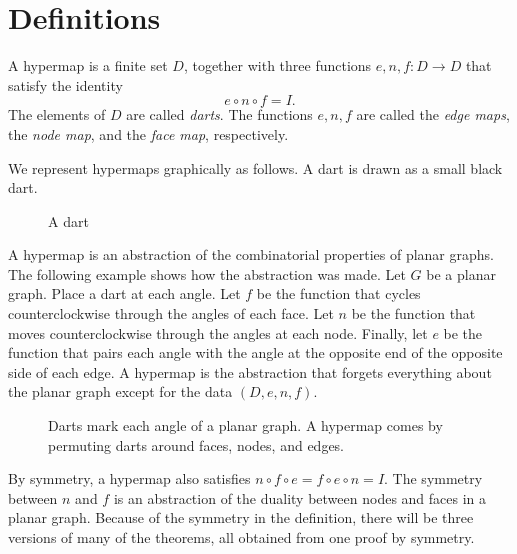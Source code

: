 


\section{Definitions}



\begin{definition}  A hypermap is a finite set $D$, together with
three functions $e,n,f:D\to D$ that satisfy the identity
    $$e\circ n\circ f = I.$$
The elements of $D$ are called {\it darts}.  The functions $e,n,f$
are called the {\it edge maps}, the {\it node map}, and the {\it
face map}, respectively.
\end{definition}



\begin{remark*} We represent hypermaps graphically as follows.  A
dart is drawn as a small black dart.
\end{remark*}

\begin{figure}[htb]
  \centering
  \caption{A dart}
  \label{fig:dart}
\end{figure}

\begin{remark*}\label{rem:hypermap} A hypermap is an abstraction of
the combinatorial properties of planar graphs.  The following
example shows how the abstraction was made.  Let $G$ be a planar
graph.  Place a dart at each angle.    Let $f$ be the function that
cycles counterclockwise through the angles of each face.  Let $n$ be
the function that moves counterclockwise through the angles at each
node.  Finally, let $e$ be the function that pairs each angle with
the angle at the opposite end of the opposite side of each edge.  A
hypermap is the abstraction that forgets everything about the planar
graph except for the data $(D,e,n,f)$.
\end{remark*}

\begin{figure}[htb]
  \centering
  \caption{Darts mark each angle of a planar graph. A hypermap comes by
  permuting darts around faces, nodes, and edges.}
  \label{fig:hypermap_ex}
\end{figure}

By symmetry, a hypermap also satisfies $n\circ f\circ e = f\circ
e\circ n = I$.  The symmetry between $n$ and $f$ is an abstraction
of the duality between nodes and faces in a planar graph. Because of
the symmetry in the definition, there will be three versions of many
of the theorems, all obtained from one proof by symmetry.

